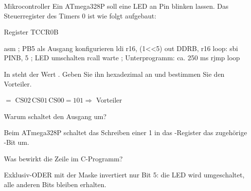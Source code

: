 \documentclass{uebungsblatt}
\begin{document}
\begin{aufgabe}{Mikrocontroller}
Ein ATmega328P soll eine LED an Pin  blinken lassen.
Das Steuerregister des Timers 0 ist wie folgt aufgebaut:

\begin{abbildung}{Register TCCR0B}
\end{abbildung}

\begin{codeblock}{asm}
; PB5 als Ausgang konfigurieren
    ldi   r16, (1<<5)
    out   DDRB, r16
loop:
    sbi   PINB, 5         ; LED umschalten
    rcall warte           ; Unterprogramm: ca. 250 ms
    rjmp  loop
\end{codeblock}


\begin{teilaufgaben}
   In  steht der Wert .
           Geben Sie ihn hexadezimal an und bestimmen Sie den Vorteiler.
    \begin{loesung}
       $=$  
      $\mathrm{CS02\,CS01\,CS00} = 101 \Rightarrow$ Vorteiler  
    \end{loesung}
   Warum schaltet  den Ausgang um?
    \begin{loesung}
      Beim ATmega328P schaltet das Schreiben einer 1 in das
      -Register das zugehörige -Bit um. 
    \end{loesung}
   Was bewirkt die Zeile  im C-Programm?
    \begin{loesung}
      Exklusiv-ODER mit der Maske  invertiert nur Bit 5:
      die LED wird umgeschaltet, alle anderen Bits bleiben erhalten. 
    \end{loesung}
\end{teilaufgaben}
\end{aufgabe}
\end{document}
